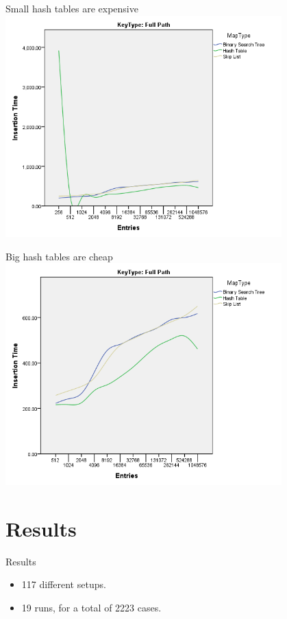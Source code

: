 \documentclass[10pt]{beamer}
\begin{document}
\begin{frame}{Small hash tables are expensive}
    \centering
    \includegraphics[width=0.8\textwidth]{hashtable_bad.png}
\end{frame}

\begin{frame}{Big hash tables are cheap}
    \centering
    \includegraphics[width=0.8\textwidth]{hashtable_good.png}
\end{frame}

\section{Results}

\begin{frame}{Results}
    \begin{itemize}
        \item 117 different setups.
        \item 19 runs, for a total of 2223 cases.
    \end{itemize}
\end{frame}
\end{document}
